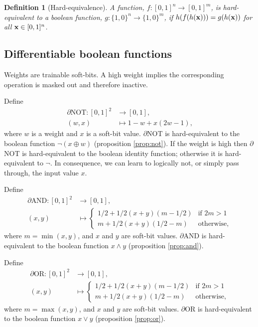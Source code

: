 \documentclass{article} %
\newtheorem*{definition}{Definition}
\begin{document}
\begin{definition}[Hard-equivalence]
	A function, $f: [0,1]^n \rightarrow [0,1]^m$, is {\em hard-equivalent} to a boolean function, $g: \{1,0\}^n \rightarrow \{1,0\}^m$,	if
	$h(f(h({\bf x}))) = g(h({\bf x}))$ for all ${\bf x} \in [0,1]^{n}$.
\end{definition}

\subsection{Differentiable boolean functions}

Weights are trainable soft-bits. A high weight implies the corresponding operation is masked out and therefore inactive.

Define
	\begin{equation*}
	\begin{aligned}
	\partial\text{NOT}: [0, 1]^{2} &\to [0,1], \\
	(w, x) &\mapsto 1 - w + x (2w - 1)\text{,}
	\end{aligned}
	\end{equation*}
where $w$ is a weight and $x$ is a soft-bit value.
$\partial${NOT} is hard-equivalent to the boolean function $\neg(x \oplus w)$ (proposition \ref{prop:not}). If the weight is high then $\partial${NOT} is hard-equivalent to the boolean identity function; otherwise it is hard-equivalent to $\neg$. In consequence, we can learn to logically not, or simply pass through, the input value $x$.

Define
\begin{equation*}
\begin{aligned}
\partial\text{AND}: [0,1]^{2} &\to [0,1], \\
	(x, y) &\mapsto 
	\begin{cases}
	1/2 + 1/2(x + y)(m - 1/2) & \text{if } 2m > 1 \\
	m + 1/2(x + y)(1/2 - m) & \text{otherwise,}
	\end{cases}
\end{aligned}
\end{equation*}
where $m=\min(x,y)$, and $x$ and $y$ are soft-bit values.
$\partial${AND} is hard-equivalent to the boolean function $x \wedge y$ (proposition \ref{prop:and}).

Define 
\begin{equation*}
\begin{aligned}
\partial\text{OR}: [0,1]^{2} &\to [0,1], \\
(x, y) &\mapsto 
\begin{cases}
	1/2 + 1/2(x + y)(m - 1/2) & \text{if } 2m > 1 \\
m + 1/2(x + y)(1/2 - m) & \text{otherwise,}
\end{cases}
\end{aligned}
\end{equation*}
where $m=\max(x,y)$, and $x$ and $y$ are soft-bit values.
$\partial${OR} is hard-equivalent to the boolean function $x \vee y$ (proposition \ref{prop:or}).
\end{document}

